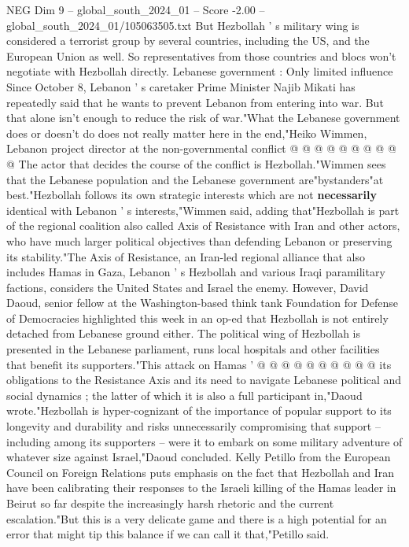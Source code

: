 \begin{textsample}{NEG Dim 9 – global\_south\_2024\_01 – Score -2.00 – global\_south\_2024\_01/105063505.txt}
But Hezbollah ' s military wing is considered a terrorist group by several countries, including the US, and the European Union as well.
So representatives from those countries and blocs won't negotiate with Hezbollah directly.
Lebanese government : Only limited influence Since October 8, Lebanon ' s caretaker Prime Minister Najib Mikati has repeatedly said that he wants to prevent Lebanon from entering into war.
But that alone isn't enough to reduce the risk of war."What the Lebanese government does or doesn't do does not really matter here in the end,"Heiko Wimmen, Lebanon project director at the non-governmental conflict @ @ @ @ @ @ @ @ @ @ The actor that decides the course of the conflict is Hezbollah."Wimmen sees that the Lebanese population and the Lebanese government are"bystanders"at best."Hezbollah follows its own strategic interests which are not \textbf{necessarily} identical with Lebanon ' s interests,"Wimmen said, adding that"Hezbollah is part of the regional coalition also called Axis of Resistance with Iran and other actors, who have much larger political objectives than defending Lebanon or preserving its stability."The Axis of Resistance, an Iran-led regional alliance that also includes Hamas in Gaza, Lebanon ' s Hezbollah and various Iraqi paramilitary factions, considers the United States and Israel the enemy.
However, David Daoud, senior fellow at the Washington-based think tank Foundation for Defense of Democracies highlighted this week in an op-ed that Hezbollah is not entirely detached from Lebanese ground either.
The political wing of Hezbollah is presented in the Lebanese parliament, runs local hospitals and other facilities that benefit its supporters."This attack on Hamas ' @ @ @ @ @ @ @ @ @ @ its obligations to the Resistance Axis and its need to navigate Lebanese political and social dynamics ; the latter of which it is also a full participant in,"Daoud wrote."Hezbollah is hyper-cognizant of the importance of popular support to its longevity and durability and risks unnecessarily compromising that support -- including among its supporters -- were it to embark on some military adventure of whatever size against Israel,"Daoud concluded.
Kelly Petillo from the European Council on Foreign Relations puts emphasis on the fact that Hezbollah and Iran have been calibrating their responses to the Israeli killing of the Hamas leader in Beirut so far despite the increasingly harsh rhetoric and the current escalation."But this is a very delicate game and there is a high potential for an error that might tip this balance if we can call it that,"Petillo said.

\end{textsample}
